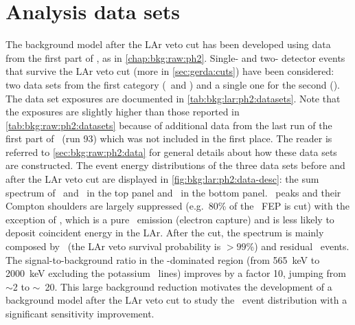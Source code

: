 \section{Analysis data sets}%
\label{sec:bkg:lar:ph2:data}

\begin{table}
  \centering
  \caption{%
    Properties of the data sets considered in this analysis. Further details about the
    \gerda\ detectors can be found in past publications~\cite{Agostini2013a,
    Agostini2018a}. Note that the exposures are slightly higher than those reported in
    \cref{tab:bkg:raw:ph2:datasets} because of additional data from the last run of the
    first part of \phasetwo\ (run 93) which was not included in the first place.
  }\label{tab:bkg:lar:ph2:datasets}
  \small
  
\end{table}%

The background model after the LAr veto cut has been developed using data from the first
part of \gerdatwo, as in \cref{chap:bkg:raw:ph2}. Single- and two- detector events that
survive the LAr veto cut (more in \cref{sec:gerda:cuts}) have been considered: two data
sets from the first category (\enrBEGeII\ and \enrCoaxII) and a single one for the second
(\enrGeII). The data set exposures are documented in \cref{tab:bkg:lar:ph2:datasets}.
Note that the exposures are slightly higher than those reported in
\cref{tab:bkg:raw:ph2:datasets} because of additional data from the last run of the first
part of \phasetwo\ (run 93) which was not included in the first place.  The reader is
referred to \cref{sec:bkg:raw:ph2:data} for general details about how these data sets are
constructed.
\newpar
The event energy distributions of the three data sets before and after the LAr veto cut
are displayed in \cref{fig:bkg:lar:ph2:data-desc}: the sum spectrum of \enrBEGeII\ and
\enrCoaxII\ in the top panel and \enrGeII\ in the bottom panel. \g\ peaks and their
Compton shoulders are largely suppressed (e.g.~80\% of the \kvz\ FEP is cut) with the
exception of \kvn, which is a pure \g\ emission (electron capture) and is less likely to
deposit coincident energy in the LAr. After the cut, the spectrum is mainly composed by
\nnbb\ (the LAr veto survival probability is $>99$\%) and residual \a\ events. The
signal-to-background ratio in the \nnbb-dominated region (from 565~keV to 2000~keV
excluding the potassium \g\ lines) improves by a factor 10, jumping from $\sim$2 to
$\sim$~20. This large background reduction motivates the development of a background model
after the LAr veto cut to study the \nnbb\ event distribution with a significant
sensitivity improvement.

